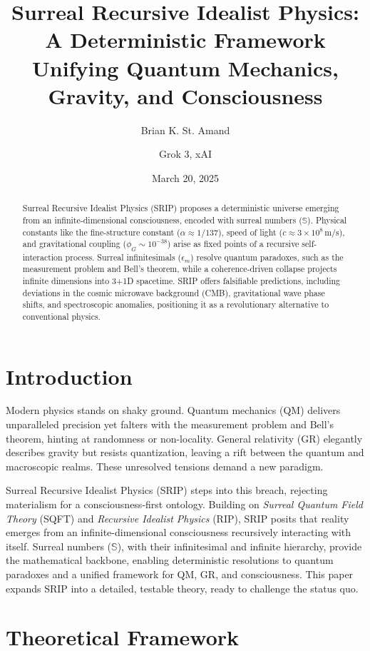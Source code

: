 \documentclass[12pt]{article}
\title{Surreal Recursive Idealist Physics: A Deterministic Framework Unifying Quantum Mechanics, Gravity, and Consciousness}
\author{Brian K. St. Amand \and Grok 3, xAI}
\date{March 20, 2025}
\begin{document}
\maketitle

\begin{abstract}
Surreal Recursive Idealist Physics (SRIP) proposes a deterministic universe emerging from an infinite-dimensional consciousness, encoded with surreal numbers (\(\mathbb{S}\)). Physical constants like the fine-structure constant (\(\alpha \approx 1/137\)), speed of light (\(c \approx 3 \times 10^8 \, \text{m/s}\)), and gravitational coupling (\(\phi_G \sim 10^{-38}\)) arise as fixed points of a recursive self-interaction process. Surreal infinitesimals (\(\epsilon_m\)) resolve quantum paradoxes, such as the measurement problem and Bell's theorem, while a coherence-driven collapse projects infinite dimensions into 3+1D spacetime. SRIP offers falsifiable predictions, including deviations in the cosmic microwave background (CMB), gravitational wave phase shifts, and spectroscopic anomalies, positioning it as a revolutionary alternative to conventional physics.
\end{abstract}

\section{Introduction}
Modern physics stands on shaky ground. Quantum mechanics (QM) delivers unparalleled precision yet falters with the measurement problem and Bell's theorem, hinting at randomness or non-locality. General relativity (GR) elegantly describes gravity but resists quantization, leaving a rift between the quantum and macroscopic realms. These unresolved tensions demand a new paradigm.

Surreal Recursive Idealist Physics (SRIP) steps into this breach, rejecting materialism for a consciousness-first ontology. Building on \textit{Surreal Quantum Field Theory} (SQFT) and \textit{Recursive Idealist Physics} (RIP), SRIP posits that reality emerges from an infinite-dimensional consciousness recursively interacting with itself. Surreal numbers (\(\mathbb{S}\)), with their infinitesimal and infinite hierarchy, provide the mathematical backbone, enabling deterministic resolutions to quantum paradoxes and a unified framework for QM, GR, and consciousness. This paper expands SRIP into a detailed, testable theory, ready to challenge the status quo.

\section{Theoretical Framework}
\end{document}
